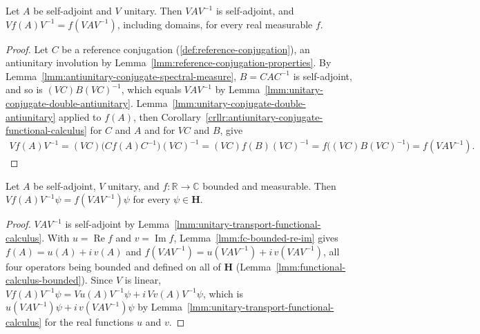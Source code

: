 \begin{lemma}
    \label{lmm:unitary-transport-functional-calculus}
    \leanok
    Let $A$ be self-adjoint and $V$ unitary. Then $VAV^{-1}$ is self-adjoint, and $Vf(A)V^{-1} = f(VAV^{-1})$, including domains, for every real measurable $f$.
\end{lemma}
\begin{proof}
    \leanok
    Let $C$ be a reference conjugation (\ref{def:reference-conjugation}), an antiunitary involution by Lemma~\ref{lmm:reference-conjugation-properties}. By Lemma~\ref{lmm:antiunitary-conjugate-spectral-measure}, $B = CAC^{-1}$ is self-adjoint, and so is $(VC)B(VC)^{-1}$, which equals $VAV^{-1}$ by Lemma~\ref{lmm:unitary-conjugate-double-antiunitary}. Lemma~\ref{lmm:unitary-conjugate-double-antiunitary} applied to $f(A)$, then Corollary~\ref{crllr:antiunitary-conjugate-functional-calculus} for $C$ and $A$ and for $VC$ and $B$, give
    \begin{align}
        Vf(A)V^{-1} = (VC)\big(Cf(A)C^{-1}\big)(VC)^{-1} = (VC)f(B)(VC)^{-1} = f\big((VC)B(VC)^{-1}\big) = f(VAV^{-1}).
    \end{align}
\end{proof}

\begin{lemma}
    \label{lmm:unitary-transport-bounded-fc}
    \leanok
    Let $A$ be self-adjoint, $V$ unitary, and $f : \mathbb{R} \to \mathbb{C}$ bounded and measurable. Then $Vf(A)V^{-1}\psi = f(VAV^{-1})\psi$ for every $\psi \in \mathbf{H}$.
\end{lemma}
\begin{proof}
    \leanok
    $VAV^{-1}$ is self-adjoint by Lemma~\ref{lmm:unitary-transport-functional-calculus}. With $u = \operatorname{Re} f$ and $v = \operatorname{Im} f$, Lemma~\ref{lmm:fc-bounded-re-im} gives $f(A) = u(A) + i\,v(A)$ and $f(VAV^{-1}) = u(VAV^{-1}) + i\,v(VAV^{-1})$, all four operators being bounded and defined on all of $\mathbf{H}$ (Lemma~\ref{lmm:functional-calculus-bounded}). Since $V$ is linear, $Vf(A)V^{-1}\psi = Vu(A)V^{-1}\psi + i\,Vv(A)V^{-1}\psi$, which is $u(VAV^{-1})\psi + i\,v(VAV^{-1})\psi$ by Lemma~\ref{lmm:unitary-transport-functional-calculus} for the real functions $u$ and $v$.
\end{proof}

